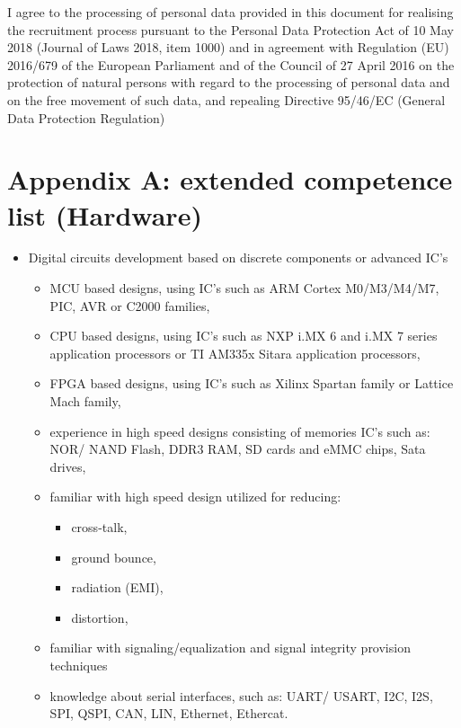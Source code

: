 \documentclass{tccv}
\begin{document}
{\tiny I agree to the processing of personal data provided in this document for realising the recruitment process pursuant to the Personal Data Protection Act of 10 May 2018 (Journal of Laws 2018, item 1000) and in agreement with Regulation (EU) 2016/679 of the European Parliament and of the Council of 27 April 2016 on the protection of natural persons with regard to the processing of personal data and on the free movement of such data, and repealing Directive 95/46/EC (General Data Protection Regulation)}

\clearpage

\onecolumn

\section{Appendix A: extended competence list (Hardware)}

\begin{itemize}
	\item Digital circuits development based on discrete components or advanced IC's
		\begin{itemize}
			\item MCU based designs, using IC's such as ARM Cortex M0/M3/M4/M7, PIC, AVR or C2000 families,
			\item CPU based designs, using IC's such as NXP i.MX 6 and i.MX 7 series application processors or TI AM335x Sitara application processors,
			\item FPGA based designs, using IC's such as Xilinx Spartan family or Lattice Mach family,
			\item experience in high speed designs consisting of memories IC's such as: NOR/ NAND Flash, DDR3 RAM, SD cards and eMMC chips, Sata drives,
			\item familiar with high speed design utilized for  reducing: 
				\begin{itemize}
				\item cross-talk, 
				\item ground bounce, 
				\item radiation (EMI), 
				\item distortion,
				\end{itemize}
			\item familiar with signaling/equalization and signal integrity provision techniques
			\item knowledge about serial interfaces, such as: UART/ USART, I2C, I2S, SPI, QSPI, CAN, LIN, Ethernet, Ethercat.
		\end{itemize}
\end{itemize}
\end{document}
